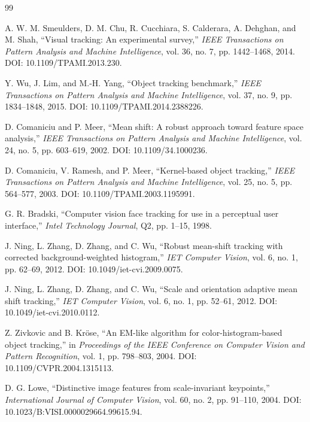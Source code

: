 \documentclass[12pt,a4paper]{article}
\numberwithin{equation}{section}
\begin{document}
\begin{thebibliography}{99}
\footnotesize
\setlength{\itemsep}{0.15em}

A. W. M. Smeulders, D. M. Chu, R. Cucchiara, S. Calderara, A. Dehghan, and M. Shah,
``Visual tracking: An experimental survey,'' \emph{IEEE Transactions on Pattern Analysis and
Machine Intelligence}, vol. 36, no. 7, pp. 1442--1468, 2014.
DOI: 10.1109/TPAMI.2013.230.

Y. Wu, J. Lim, and M.-H. Yang, ``Object tracking benchmark,'' \emph{IEEE Transactions on Pattern
Analysis and Machine Intelligence}, vol. 37, no. 9, pp. 1834--1848, 2015.
DOI: 10.1109/TPAMI.2014.2388226.

D. Comaniciu and P. Meer, ``Mean shift: A robust approach toward feature space analysis,''
\emph{IEEE Transactions on Pattern Analysis and Machine Intelligence}, vol. 24, no. 5,
pp. 603--619, 2002. DOI: 10.1109/34.1000236.

D. Comaniciu, V. Ramesh, and P. Meer, ``Kernel-based object tracking,''
\emph{IEEE Transactions on Pattern Analysis and Machine Intelligence}, vol. 25, no. 5,
pp. 564--577, 2003. DOI: 10.1109/TPAMI.2003.1195991.

G. R. Bradski, ``Computer vision face tracking for use in a perceptual user interface,''
\emph{Intel Technology Journal}, Q2, pp. 1--15, 1998.

J. Ning, L. Zhang, D. Zhang, and C. Wu, ``Robust mean-shift tracking with corrected
background-weighted histogram,'' \emph{IET Computer Vision}, vol. 6, no. 1, pp. 62--69, 2012.
DOI: 10.1049/iet-cvi.2009.0075.

J. Ning, L. Zhang, D. Zhang, and C. Wu, ``Scale and orientation adaptive mean shift tracking,''
\emph{IET Computer Vision}, vol. 6, no. 1, pp. 52--61, 2012.
DOI: 10.1049/iet-cvi.2010.0112.

Z. Zivkovic and B. Kr\"ose, ``An EM-like algorithm for color-histogram-based object tracking,''
in \emph{Proceedings of the IEEE Conference on Computer Vision and Pattern Recognition},
vol. 1, pp. 798--803, 2004. DOI: 10.1109/CVPR.2004.1315113.

D. G. Lowe, ``Distinctive image features from scale-invariant keypoints,''
\emph{International Journal of Computer Vision}, vol. 60, no. 2, pp. 91--110, 2004.
DOI: 10.1023/B:VISI.0000029664.99615.94.


\end{thebibliography}
\end{document}
